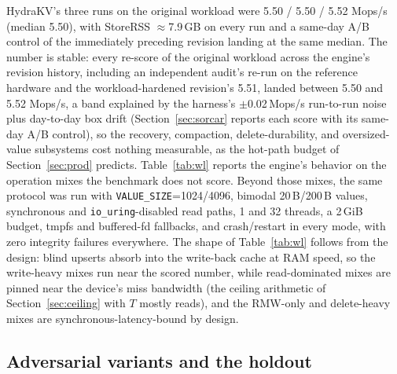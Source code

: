 \documentclass{article}
\newcommand{\HydraProd}{5.52}           %
\newcommand{\HydraAuditFixed}{5.50}     %
\newcommand{\HydraHardenedWL}{5.51}     %
\newcommand{\HydraFinalWL}{5.50}        %
\newcommand{\HydraFinalWLRuns}{5.50 / 5.50 / 5.52}
\begin{document}
HydraKV's three runs on the original workload were \HydraFinalWLRuns{} Mops/s (median \HydraFinalWL), with StoreRSS $\approx$7.9\,GB on every run and a same-day A/B control of the immediately preceding revision landing at the same median. The number is stable: every re-score of the original workload across the engine's revision history, including an independent audit's re-run on the reference hardware and the workload-hardened revision's \HydraHardenedWL{}, landed between \HydraAuditFixed{} and \HydraProd{} Mops/s, a band explained by the harness's $\pm$0.02\,Mops/s run-to-run noise plus day-to-day box drift (Section~\ref{sec:sorcar} reports each score with its same-day A/B control), so the recovery, compaction, delete-durability, and oversized-value subsystems cost nothing measurable, as the hot-path budget of Section~\ref{sec:prod} predicts. Table~\ref{tab:wl} reports the engine's behavior on the operation mixes the benchmark does not score. Beyond those mixes, the same protocol was run with \texttt{VALUE\_SIZE}=1024/4096, bimodal 20\,B/200\,B values, synchronous and \texttt{io\_uring}-disabled read paths, 1 and 32 threads, a 2\,GiB budget, tmpfs and buffered-fd fallbacks, and crash/restart in every mode, with zero integrity failures everywhere. The shape of Table~\ref{tab:wl} follows from the design: blind upserts absorb into the write-back cache at RAM speed, so the write-heavy mixes run near the scored number, while read-dominated mixes are pinned near the device's miss bandwidth (the ceiling arithmetic of Section~\ref{sec:ceiling} with $T$ mostly reads), and the RMW-only and delete-heavy mixes are synchronous-latency-bound by design.

\subsection{Adversarial variants and the holdout}
\label{sec:adversarial}
\end{document}
